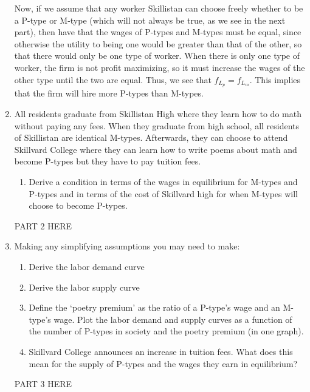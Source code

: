 \documentclass[12pt]{article}
\begin{document}
\begin{enumerate}
Now, if we assume that any worker Skillistan can choose freely whether to be a P-type or M-type (which will not always be true, as we see in the next part), then have that the wages of P-types and M-types must be equal, since otherwise the utility to being one would be greater than that of the other, so that there would only be one type of worker.  When there is only one type of worker, the firm is not profit maximizing, so it must increase the wages of the other type until the two are equal.  Thus, we see that $f_{L_p} = f_{L_m}$.  This implies that the firm will hire more P-types than M-types.  

	\item{All residents graduate from Skillistan High where they learn how to do math without
paying any fees. When they graduate from high school, all residents of Skillistan are
identical M-types. Afterwards, they can choose to attend Skillvard College where
they can learn how to write poems about math and become P-types but they have
to pay tuition fees.}

\begin{enumerate}

	\item{Derive a condition in terms of the wages in equilibrium for M-types and P-types
and in terms of the cost of Skillvard high for when M-types will choose to become
P-types.}

\end{enumerate}

PART 2 HERE

	\item{Making any simplifying assumptions you may need to make:}
	
\begin{enumerate}

	\item{Derive the labor demand curve}
	\item{Derive the labor supply curve}
	\item{Define the `poetry premium’ as the ratio of a P-type’s wage and an M-type’s
wage. Plot the labor demand and supply curves as a function of the number of
P-types in society and the poetry premium (in one graph).}
	\item{Skillvard College announces an increase in tuition fees. What does this mean
for the supply of P-types and the wages they earn in equilibrium?}

\end{enumerate}

PART 3 HERE


\end{enumerate}
\end{document}
